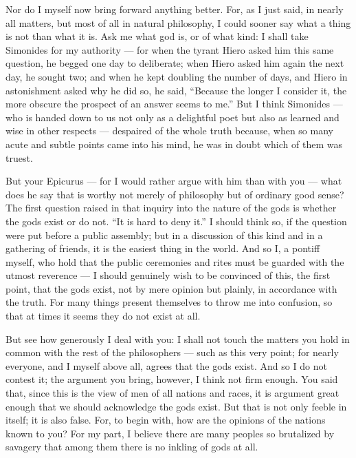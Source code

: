  Nor do I myself now bring forward anything better. For, as I just said, in nearly all matters, but most of all in natural philosophy, I could sooner say what a thing is not than what it is. Ask me what god is, or of what kind: I shall take Simonides for my authority — for when the tyrant Hiero asked him this same question, he begged one day to deliberate; when Hiero asked him again the next day, he sought two; and when he kept doubling the number of days, and Hiero in astonishment asked why he did so, he said, ``Because the longer I consider it, the more obscure the prospect of an answer seems to me.'' But I think Simonides — who is handed down to us not only as a delightful poet but also as learned and wise in other respects — despaired of the whole truth because, when so many acute and subtle points came into his mind, he was in doubt which of them was truest.

 But your Epicurus — for I would rather argue with him than with you — what does he say that is worthy not merely of philosophy but of ordinary good sense? The first question raised in that inquiry into the nature of the gods is whether the gods exist or do not. ``It is hard to deny it.'' I should think so, if the question were put before a public assembly; but in a discussion of this kind and in a gathering of friends, it is the easiest thing in the world. And so I, a pontiff myself, who hold that the public ceremonies and rites must be guarded with the utmost reverence — I should genuinely wish to be convinced of this, the first point, that the gods exist, not by mere opinion but plainly, in accordance with the truth. For many things present themselves to throw me into confusion, so that at times it seems they do not exist at all.

 But see how generously I deal with you: I shall not touch the matters you hold in common with the rest of the philosophers — such as this very point; for nearly everyone, and I myself above all, agrees that the gods exist. And so I do not contest it; the argument you bring, however, I think not firm enough. You said that, since this is the view of men of all nations and races, it is argument great enough that we should acknowledge the gods exist. But that is not only feeble in itself; it is also false. For, to begin with, how are the opinions of the nations known to you? For my part, I believe there are many peoples so brutalized by savagery that among them there is no inkling of gods at all.

